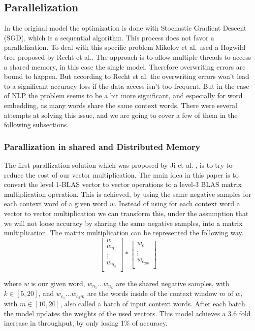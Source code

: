 {\subsection{Parallelization}
In the original model the optimization is done with Stochastic Gradient Descent (SGD), which is a sequential algorithm. This process does not favor a parallelization. To deal with this specific problem Mikolov et al.\cite{mikolov2} used a Hogwild tree proposed by Recht et al.\cite{hogwild}. The approach is to allow multiple threads to access a shared memory, in this case the single model. Therefore overwriting errors are bound to happen. But according to Recht et al.\cite{hogwild} the overwriting errors won't lead to a significant accuracy loss if the data access isn't too frequent. But in the case of NLP the problem seems to be a bit more significant, and especially for word embedding, as many words share the same context words. There were several attempts at solving this issue, and we are going to cover a few of them in the following subsections. 

\subsubsection{Parallization in shared and Distributed Memory}
The first parallization solution which was proposed by Ji et al. \cite{intel}, is to try to reduce the cost of our vector multiplication. The main idea in this paper is to convert the level 1-BLAS vector to vector operations to a level-3 BLAS matrix multiplication operation. This is achieved, by using the same negative samples for each context word of a given word $w$. Instead of using for each context word a vector to vector multiplication we can transform this, under the assumption that we will not loose accuracy by sharing the same negative samples,  into a matrix multiplication. The matrix multiplication can be represented the following way.
\[
\begin{bmatrix}
w \\
w_{n_1}  \\
\vdots \\
w_{n_k}\\
\end{bmatrix}
*
\begin{bmatrix}
w_{c_1}\\
\vdots\\
w_{c_{2m}}\\
\end{bmatrix}
\]

where $w$ is our given word, $w_{n_1}...w_{n_k}$ are the shared negative samples, with $k \in [5,20]$, and $w_{c_1}...w_{c_2m}$ are the words inside of the context window $m$ of $w$, with $m \in [10,20]$, also called a batch of input context words. After each batch the model updates the weights of the used vectors. 
This model achieves a 3.6 fold increase in throughput, by only losing 1\% of accuracy. 
}
